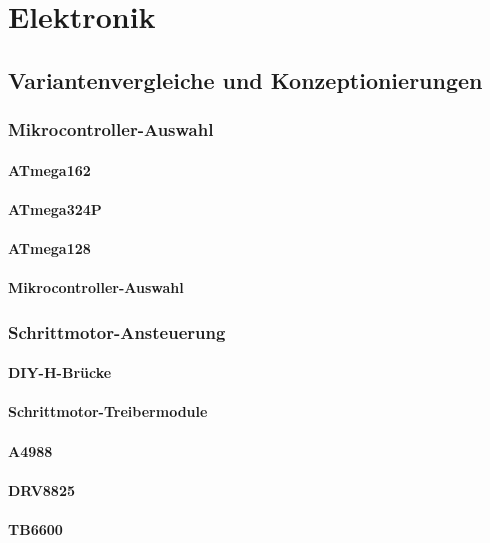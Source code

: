 \chapter{Elektronik}

\section{Variantenvergleiche und Konzeptionierungen}

\subsection{Mikrocontroller-Auswahl}
\label{subsec:mikrocontroller-auswahl}
\subsubsection{ATmega162}
\subsubsection{ATmega324P}
\subsubsection{ATmega128}
\subsubsection{Mikrocontroller-Auswahl}


\subsection{Schrittmotor-Ansteuerung}
\subsubsection{DIY-H-Brücke}
\subsubsection{Schrittmotor-Treibermodule}
\subsubsection{A4988}
\subsubsection{DRV8825}
\subsubsection{TB6600}
